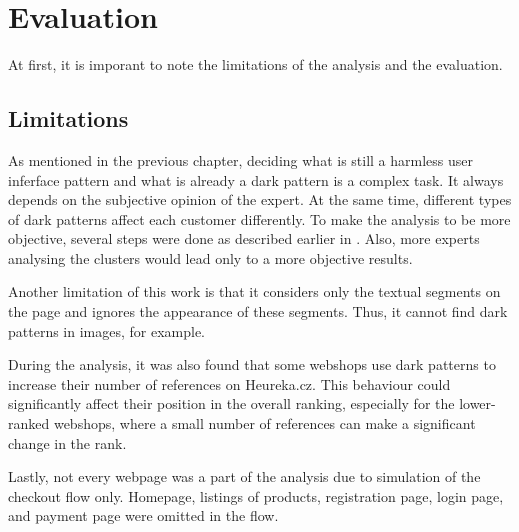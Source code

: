\chapter{Evaluation}

At first, it is imporant to note the limitations of the analysis and the evaluation.

\section{Limitations}
As mentioned in the previous chapter, deciding what is still a harmless user inferface pattern and what is already a dark pattern is a complex task. It always depends on the subjective opinion of the expert. At the same time, different types of dark patterns affect each customer differently. To make the analysis to be more objective, several steps were done as described earlier in . Also, more experts analysing the clusters would lead only to a more objective results.

Another limitation of this work is that it considers only the textual segments on the page and ignores the appearance of these segments. Thus, it cannot find dark patterns in images, for example.

During the analysis, it was also found that some webshops use dark patterns to increase their number of references on Heureka.cz. This behaviour could significantly affect their position in the overall ranking, especially for the lower-ranked webshops, where a small number of references can make a significant change in the rank.

Lastly, not every webpage was a part of the analysis due to simulation of the checkout flow only. Homepage, listings of products, registration page, login page, and payment page were omitted in the flow.


